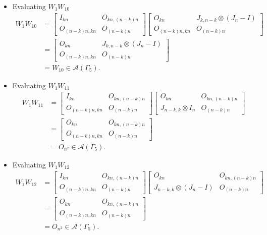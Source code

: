 \begin{itemize}
\item Evaluating $W_{1}W_{10}$
\begin{align*}
W_1W_{10} &=
\begin{bmatrix}
I_{kn} & O_{kn, (n-k)n} \\
O_{(n-k)n,kn} & O_{(n-k)n}
\end{bmatrix}\begin{bmatrix}
O_{kn} & J_{k,n-k} \otimes (J_n-I) \\
O_{(n-k)n,kn} & O_{(n-k)n}
\end{bmatrix}\\
&= \begin{bmatrix}
O_{kn} & J_{k,n-k} \otimes (J_n-I) \\
O_{(n-k)n,kn} & O_{(n-k)n}
\end{bmatrix}\\
&= W_{10} \in\mathcal{A}(\Gamma_5).
\end{align*}

\item Evaluating $W_{1}W_{11}$
\begin{align*}
W_1W_{11} &=
\begin{bmatrix}
I_{kn} & O_{kn, (n-k)n} \\
O_{(n-k)n,kn} & O_{(n-k)n}
\end{bmatrix}\begin{bmatrix}
O_{kn} & O_{kn, (n-k)n} \\
J_{n-k, k}\otimes I_n & O_{(n-k)n}
\end{bmatrix}\\
&= \begin{bmatrix}
O_{kn} & O_{kn, (n-k)n} \\
O_{(n-k)n,kn} & O_{(n - k)n}
\end{bmatrix}\\
&= O_{n^2} \in\mathcal{A}(\Gamma_5).
\end{align*}

\item Evaluating $W_{1}W_{12}$
\begin{align*}
W_1W_{12} &=
\begin{bmatrix}
I_{kn} & O_{kn, (n-k)n} \\
O_{(n-k)n,kn} & O_{(n-k)n}
\end{bmatrix}\begin{bmatrix}
O_{kn} & O_{kn, (n-k)n} \\
J_{n-k, k}\otimes (J_n-I) & O_{(n-k)n}
\end{bmatrix}\\
&= \begin{bmatrix}
O_{kn} & O_{kn, (n-k)n} \\
O_{(n-k)n,kn} & O_{(n - k)n}
\end{bmatrix}\\
&= O_{n^2} \in\mathcal{A}(\Gamma_5).
\end{align*}


\end{itemize}
